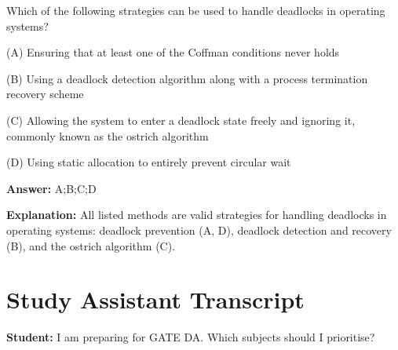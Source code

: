 \begin{tcolorbox}[enhanced,breakable,colback=boxgray,colframe=gray!45,boxrule=0.4pt,arc=2pt,left=6pt,right=6pt,top=4pt,bottom=4pt,title={Q.4},fonttitle=\bfseries\small,coltitle=black,colbacktitle=gray!15]
\small Which of the following strategies can be used to handle deadlocks in operating systems?\par\par\hspace*{1em}(A) Ensuring that at least one of the Coffman conditions never holds\par\hspace*{1em}(B) Using a deadlock detection algorithm along with a process termination recovery scheme\par\hspace*{1em}(C) Allowing the system to enter a deadlock state freely and ignoring it, commonly known as the ostrich algorithm\par\hspace*{1em}(D) Using static allocation to entirely prevent circular wait\par{}\par\smallskip\textbf{Answer:} A;B;C;D\par\par\textbf{Explanation:} All listed methods are valid strategies for handling deadlocks in operating systems: deadlock prevention (A, D), deadlock detection and recovery (B), and the ostrich algorithm (C).\par
\end{tcolorbox}


\section{Study Assistant Transcript}

\par\noindent\textbf{Student:} I am preparing for GATE DA. Which subjects should I prioritise?\par\smallskip

